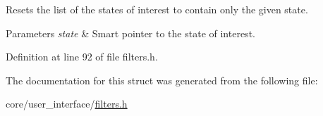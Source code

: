 Resets the list of the states of interest to contain only the given state. 


\begin{DoxyParams}{Parameters}
{\em state} & Smart pointer to the state of interest. \\
\hline
\end{DoxyParams}


Definition at line 92 of file filters.\+h.



The documentation for this struct was generated from the following file\+:\begin{DoxyCompactItemize}
\item 
core/user\+\_\+interface/\hyperlink{filters_8h}{filters.\+h}\end{DoxyCompactItemize}

